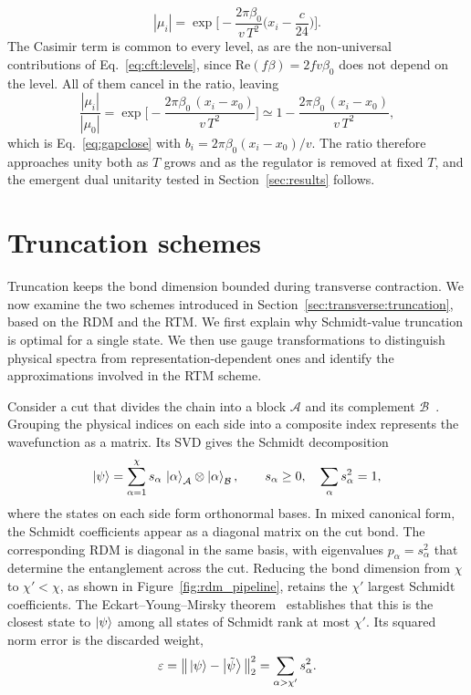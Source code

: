 \begin{equation}
  |\mu_i| = \exp\Big[-\frac{2\pi\beta_0}{v\,T^{2}}\Big(x_i-\frac{c}{24}\Big)\Big].
  \label{eq:app:modulus}
\end{equation}
The Casimir term is common to every level, as are the non-universal contributions of Eq.~\eqref{eq:cft:levels}, since $\mathrm{Re}(f\beta)=2fv\beta_0$ does not depend on the level. All of them cancel in the ratio, leaving
\begin{equation}
  \frac{|\mu_i|}{|\mu_0|} = \exp\Big[-\frac{2\pi\beta_0\,(x_i-x_0)}{v\,T^{2}}\Big]
  \simeq 1-\frac{2\pi\beta_0\,(x_i-x_0)}{v\,T^{2}},
  \label{eq:app:gapclose_derived}
\end{equation}
which is Eq.~\eqref{eq:gapclose} with $b_i=2\pi\beta_0(x_i-x_0)/v$. The ratio therefore approaches unity both as $T$ grows and as the regulator is removed at fixed $T$, and the emergent dual unitarity tested in Section~\ref{sec:results} follows.


\FloatBarrier
\section{Truncation schemes}
\label{app:tensor_networks}


Truncation keeps the bond dimension bounded during transverse contraction. We now examine the two schemes introduced in Section~\ref{sec:transverse:truncation}, based on the \ac{RDM} and the \ac{RTM}. We first explain why Schmidt-value truncation is optimal for a single state. We then use gauge transformations to distinguish physical spectra from representation-dependent ones and identify the approximations involved in the \ac{RTM} scheme.

Consider a cut that divides the chain into a block $\mathcal{A}$ and its complement $\mathcal{B}$~\cite{schollwock2011,vidal2003}. Grouping the physical indices on each side into a composite index represents the wavefunction as a matrix. Its \ac{SVD} gives the Schmidt decomposition
\begin{equation}
  \ket\psi = \sum_{\alpha=1}^{\chi} s_\alpha\,
  \ket{\alpha}_{\mathcal A}\otimes\ket{\alpha}_{\mathcal B},
  \qquad s_\alpha\ge0,\quad \sum_\alpha s_\alpha^2=1,
\end{equation}
where the states on each side form orthonormal bases. In mixed canonical form, the Schmidt coefficients appear as a diagonal matrix on the cut bond. The corresponding \ac{RDM} is diagonal in the same basis, with eigenvalues $p_\alpha=s_\alpha^2$ that determine the entanglement across the cut. Reducing the bond dimension from $\chi$ to $\chi'<\chi$, as shown in Figure~\ref{fig:rdm_pipeline}, retains the $\chi'$ largest Schmidt coefficients. The Eckart--Young--Mirsky theorem~\cite{eckart1936,mirsky1960} establishes that this is the closest state to $\ket\psi$ among all states of Schmidt rank at most $\chi'$. Its squared norm error is the discarded weight,
\begin{equation}
  \varepsilon = \big\lVert \ket\psi - \ket{\tilde\psi}\big\rVert_2^2
  = \sum_{\alpha>\chi'} s_\alpha^2.
\end{equation}

